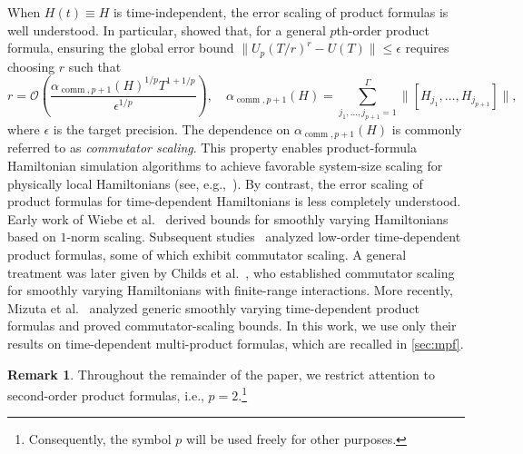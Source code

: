 \documentclass[10pt,reqno]{article}
\numberwithin{equation}{section}
\theoremstyle{plain}
\theoremstyle{definition}
\newtheorem{remark}[thm]{Remark}
\begin{document}
When \(H(t) \equiv H\) is time-independent, the error scaling of product formulas is well understood. In particular, \cite{Childs2021theorytrotter} showed that, for a general \(p\)th-order product formula, ensuring the global error bound \(\lVert U_p(T/r)^r - U(T) \rVert \le \epsilon\) requires choosing \(r\) such that
\begin{equation}\label{product-error}
r = \mathcal{O} \left( \frac{\alpha_{\operatorname{comm},p+1}(H)^{1/p} T^{1+1/p}}{\epsilon^{1/p}} \right), \quad \alpha_{\operatorname{comm},p+1}(H) = \sum_{j_1,\dots,j_{p+1}=1}^{\Gamma} \|[H_{j_1},\dots,H_{j_{p+1}}]\|,
\end{equation}
where $\epsilon$ is the target precision. The dependence on \(\alpha_{\operatorname{comm},p+1}(H)\) is commonly referred to as \emph{commutator scaling}. This property enables product-formula Hamiltonian simulation algorithms to achieve favorable system-size scaling for physically local Hamiltonians (see, e.g.,~\cite{babbush2015chemical,wecker2015solving,childs2018toward}). By contrast, the error scaling of product formulas for time-dependent Hamiltonians is less completely understood. Early work of Wiebe et al.~\cite{wiebe2010higher} derived bounds for smoothly varying Hamiltonians based on \(1\)-norm scaling. Subsequent studies~\cite{berry2020time,an2021time,ikeda2023minimum} analyzed low-order time-dependent product formulas, some of which exhibit commutator scaling. A general treatment was later given by Childs et al.~\cite{childs2019optimalproduct}, who established commutator scaling for smoothly varying Hamiltonians with finite-range interactions. More recently, Mizuta et al.~\cite{mizuta2024MPFtimedep} analyzed generic smoothly varying time-dependent product formulas and proved commutator-scaling bounds. In this work, we use only their results on time-dependent multi-product formulas, which are recalled in \cref{sec:mpf}.

\begin{remark}\label{prod-2-conv}
Throughout the remainder of the paper, we restrict attention to second-order product formulas, i.e., \(p=2\).\footnote{Consequently, the symbol \(p\) will be used freely for other purposes.}
\end{remark}

\end{document}
